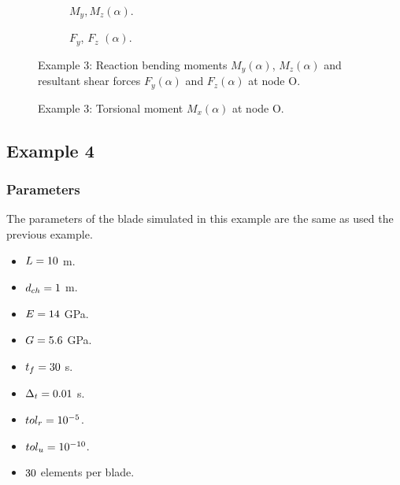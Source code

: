 \documentclass[3p,a4paper,11pt,review]{elsarticle}
\begin{document}
\begin{figure}[htb]
	\begin{subfigure}{.5\textwidth}
		\centering
		\resizebox{.9\textwidth}{!}{}		
		\caption{$M_y, M_z(\alpha)$.}
		\label{fig:BladeCantMYMZStatic}
	\end{subfigure}
	\begin{subfigure}{0.5\textwidth}
		\centering
		\resizebox{.9\textwidth}{!}{}		
		\caption{$F_y$, $F_z$ $(\alpha)$.}
		\label{fig:BladeCantForcesStatic}
	\end{subfigure}
	\caption{Example 3: Reaction bending moments $M_y(\alpha)$, $M_z(\alpha)$ and resultant shear forces $F_y(\alpha)$ and $F_z(\alpha)$ at node O.}
	\label{fig:BladeCantStaticBending}
\end{figure}

\begin{figure}[htb]
	\centering
	\resizebox{.45\textwidth}{!}{}
	\caption{Example 3: Torsional moment $M_x(\alpha)$ at node O.}
	\label{fig:BladeCantMXStatic}
\end{figure}


\clearpage 

\subsection{Example 4}



\subsubsection{Parameters}

The parameters of the blade simulated in this example are the same as used the previous example. 
\begin{itemize}
	\item $L = 10$ m.
	\item $d_{ch} = 1$ m.
	\item $E = 14$ GPa. 
	\item $G = 5.6$ GPa. 
	\item $t_f = 30$ s.
	\item $\Delta_t = 0.01$ s.
	\item  $tol_r = 10^{-5}$.
	\item $tol_u = 10^{-10}$.
	\item $30$ elements per blade.
\end{itemize}
\end{document}

